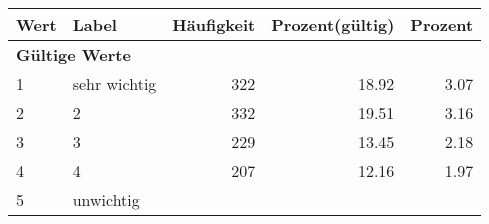      \begin{longtable}{lXrrr}
     \toprule
     \textbf{Wert} & \textbf{Label} & \textbf{Häufigkeit} & \textbf{Prozent(gültig)} & \textbf{Prozent} \\
     \endhead
     \midrule
     \multicolumn{5}{l}{\textbf{Gültige Werte}}\\

     1 &
     \multicolumn{1}{X}{ sehr wichtig   } &


       \num{322} &
       \num[round-mode=places,round-precision=2]{18,92} &
         \num[round-mode=places,round-precision=2]{3,07} \\

     2 &
     \multicolumn{1}{X}{ 2   } &


       \num{332} &
       \num[round-mode=places,round-precision=2]{19,51} &
         \num[round-mode=places,round-precision=2]{3,16} \\

     3 &
     \multicolumn{1}{X}{ 3   } &


       \num{229} &
       \num[round-mode=places,round-precision=2]{13,45} &
         \num[round-mode=places,round-precision=2]{2,18} \\

     4 &
     \multicolumn{1}{X}{ 4   } &


       \num{207} &
       \num[round-mode=places,round-precision=2]{12,16} &
         \num[round-mode=places,round-precision=2]{1,97} \\

     5 &
     \multicolumn{1}{X}{ unwichtig   } &



\end{longtable}
